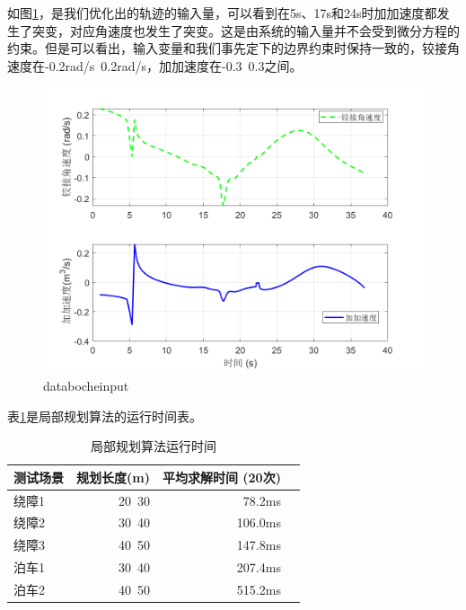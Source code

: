 \documentclass[master,academic]{ysuthesis} %
\begin{document}
		如图\ref{fig:databocheinput}，是我们优化出的轨迹的输入量，可以看到在5s、17s和24s时加加速度都发生了突变，对应角速度也发生了突变。这是由系统的输入量并不会受到微分方程的约束。但是可以看出，输入变量和我们事先定下的边界约束时保持一致的，铰接角速度在-0.2rad/s~0.2rad/s，加加速度在-0.3~0.3之间。
		\begin{figure}[!ht]
			\centering
			\includegraphics[width=1\textwidth]{databocheinput.png}
			\caption{databocheinput}
			\label{fig:databocheinput}
		\end{figure}

		表\ref{tab:local_planning_boche_time}是局部规划算法的运行时间表。
		\begin{table}[!ht]
			\caption{局部规划算法运行时间}
			\label{tab:local_planning_boche_time}
			\centering
			\begin{tabular}{l rrr}
				\toprule
				测试场景   & 规划长度(m) & 平均求解时间 (20次) \\
				\midrule
				绕障1 & 20~30    & 78.2ms   \\
				绕障2 & 30~40    & 106.0ms  \\
				绕障3 & 40~50    & 147.8ms  \\
				泊车1  & 30~40   & 207.4ms  \\
				泊车2  & 40~50   & 515.2ms  \\
				\bottomrule
			\end{tabular}
		\end{table}
\end{document}
